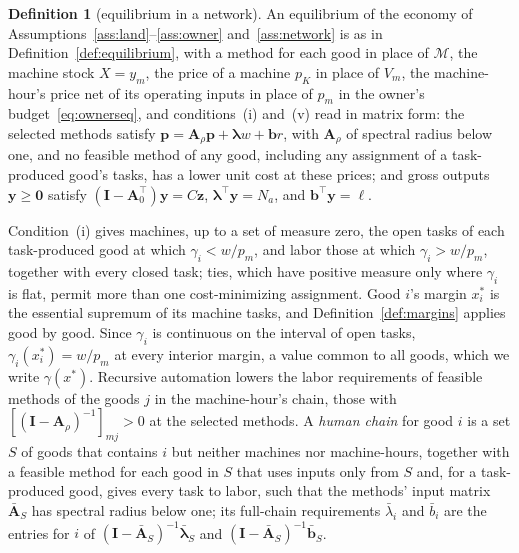 \documentclass[12pt]{article}
\theoremstyle{plain}
\theoremstyle{definition}
\newtheorem{definition}{Definition}
\theoremstyle{remark}
\begin{document}
\begin{definition}[equilibrium in a network]\label{def:network}
An equilibrium of the economy of Assumptions~\ref{ass:land}--\ref{ass:owner} and~\ref{ass:network} is as in Definition~\ref{def:equilibrium}, with a method for each good in place of $\mathcal M$, the machine stock $X=y_m$, the price of a machine $p_K$ in place of $V_m$, the machine-hour's price net of its operating inputs in place of $p_m$ in the owner's budget~\eqref{eq:ownerseq}, and conditions~(i) and~(v) read in matrix form: the selected methods satisfy $\mathbf p=\mathbf A_\rho\mathbf p+\bm\lambda w+\mathbf b r$, with $\mathbf A_\rho$ of spectral radius below one, and no feasible method of any good, including any assignment of a task-produced good's tasks, has a lower unit cost at these prices; and gross outputs $\mathbf y\ge\mathbf 0$ satisfy $(\mathbf I-\mathbf A_0^{\top})\mathbf y=C\mathbf z$, $\bm\lambda^{\top}\mathbf y=N_a$, and $\mathbf b^{\top}\mathbf y=\ell$.
\end{definition}

Condition~(i) gives machines, up to a set of measure zero, the open tasks of each task-produced good at which $\gamma_i<w/p_m$, and labor those at which $\gamma_i>w/p_m$, together with every closed task; ties, which have positive measure only where $\gamma_i$ is flat, permit more than one cost-minimizing assignment. Good $i$'s margin $x_i^*$ is the essential supremum of its machine tasks, and Definition~\ref{def:margins} applies good by good. Since $\gamma_i$ is continuous on the interval of open tasks, $\gamma_i(x_i^*)=w/p_m$ at every interior margin, a value common to all goods, which we write $\gamma(x^*)$. Recursive automation lowers the labor requirements of feasible methods of the goods $j$ in the machine-hour's chain, those with $[(\mathbf I-\mathbf A_\rho)^{-1}]_{mj}>0$ at the selected methods. A \emph{human chain} for good $i$ is a set $S$ of goods that contains $i$ but neither machines nor machine-hours, together with a feasible method for each good in $S$ that uses inputs only from $S$ and, for a task-produced good, gives every task to labor, such that the methods' input matrix $\bar{\mathbf A}_S$ has spectral radius below one; its full-chain requirements $\bar\lambda_i$ and $\bar b_i$ are the entries for $i$ of $(\mathbf I-\bar{\mathbf A}_S)^{-1}\bar{\bm\lambda}_S$ and $(\mathbf I-\bar{\mathbf A}_S)^{-1}\bar{\mathbf b}_S$.
\end{document}
